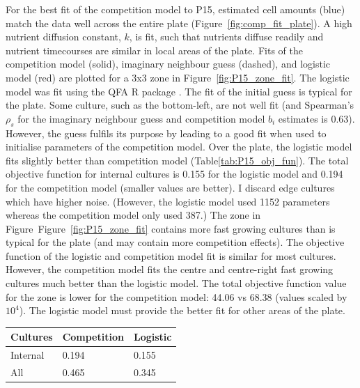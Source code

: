 For the best fit of the competition model to P15, estimated cell
amounts (blue) match the data well across the entire plate
(Figure~\ref{fig:comp_fit_plate}). A high nutrient diffusion constant,
\(k\), is fit, such that nutrients diffuse readily and nutrient
timecourses are similar in local areas of the plate. Fits of the
competition model (solid), imaginary neighbour guess (dashed), and
logistic model (red) are plotted for a 3x3 zone in
Figure~\ref{fig:P15_zone_fit}. The logistic model was fit using the
QFA R package \citep{qfa2016}. The fit of the initial guess is typical
for the plate. Some culture, such as the bottom-left, are not well fit
(and Spearman's \(\rho_{s}\) for the imaginary neighbour guess and
competition model \(b_{i}\) estimates is 0.63). However, the guess
fulfils its purpose by leading to a good fit when used to initialise
parameters of the competition model. Over the plate, the logistic
model fits slightly better than competition model
(Table\ref{tab:P15_obj_fun}). The total objective function for
internal cultures is 0.155 for the logistic model and 0.194 for the
competition model (smaller values are better). I discard edge cultures
which have higher noise. (However, the logistic model used 1152
parameters whereas the competition model only used 387.) The zone in
Figure~Figure~\ref{fig:P15_zone_fit} contains more fast growing
cultures than is typical for the plate (and may contain more
competition effects). The objective function of the logistic and
competition model fit is similar for most cultures. However, the
competition model fits the centre and centre-right fast growing
cultures much better than the logistic model. The total objective
function value for the zone is lower for the competition model: 44.06
vs 68.38 (values scaled by \(10^{4}\)). The logistic model must
provide the better fit for other areas of the plate.

\begin{center}
  \begin{tabular}{l l l}
    \hline
    Cultures     & Competition & Logistic \\
    \hline
    Internal     & 0.194    & 0.155\\
    All          & 0.465    & 0.345\\
    \hline
  \end{tabular}
  \label{tab:P15_obj_fun}
\end{center}

